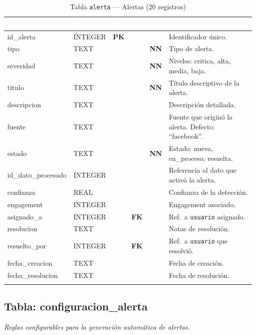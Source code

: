 \documentclass[11pt,a4paper]{article}
\newcommand{\tableheadrow}{\rowcolor{tableheader}}
\newcommand{\tablehead}[1]{\textcolor{white}{\textbf{#1}}}
\newcommand{\pk}{\textcolor{emiblue}{\textbf{PK}}}
\newcommand{\fk}{\textcolor{orange!80!black}{\textbf{FK}}}
\newcommand{\nn}{\textcolor{red!70!black}{\textbf{NN}}}
\begin{document}
\begin{longtable}{p{4.2cm} p{2.8cm} c c c p{4.5cm}}
\toprule
\tableheadrow
\tablehead{Campo} & \tablehead{Tipo} & \tablehead{PK} & \tablehead{FK} & \tablehead{NN} & \tablehead{Descripción} \\
\midrule
\endhead
id\_alerta & INTEGER & \pk & & & Identificador único. \\
\rowcolor{tablerow}
tipo & TEXT & & & \nn & Tipo de alerta. \\
severidad & TEXT & & & \nn & Niveles: critica, alta, media, baja. \\
\rowcolor{tablerow}
titulo & TEXT & & & \nn & Título descriptivo de la alerta. \\
descripcion & TEXT & & & & Descripción detallada. \\
\rowcolor{tablerow}
fuente & TEXT & & & & Fuente que originó la alerta. Defecto: ``facebook''. \\
estado & TEXT & & & \nn & Estado: nueva, en\_proceso, resuelta. \\
\rowcolor{tablerow}
id\_dato\_procesado & INTEGER & & & & Referencia al dato que activó la alerta. \\
confianza & REAL & & & & Confianza de la detección. \\
\rowcolor{tablerow}
engagement & INTEGER & & & & Engagement asociado. \\
asignado\_a & INTEGER & & \fk & & Ref.\ a \texttt{usuario} asignado. \\
\rowcolor{tablerow}
resolucion & TEXT & & & & Notas de resolución. \\
resuelto\_por & INTEGER & & \fk & & Ref.\ a \texttt{usuario} que resolvió. \\
\rowcolor{tablerow}
fecha\_creacion & TEXT & & & & Fecha de creación. \\
fecha\_resolucion & TEXT & & & & Fecha de resolución. \\
\bottomrule
\caption{Tabla \texttt{alerta} — Alertas (20 registros)}
\end{longtable}

\subsection{Tabla: configuracion\_alerta}
\textit{Reglas configurables para la generación automática de alertas.}
\end{document}

